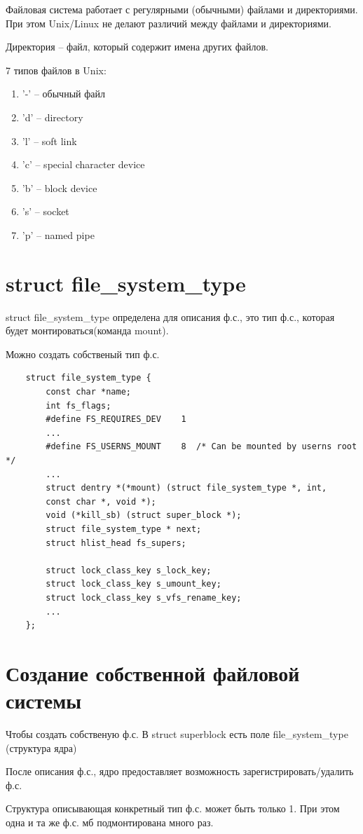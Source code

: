 Файловая система работает с регулярными (обычными) файлами и директориями. При этом Unix/Linux не делают различий между файлами и директориями.

Директория -- файл, который содержит имена других файлов.

7 типов файлов в Unix:
\begin{enumerate}
    \item '-' -- обычный файл
    \item 'd' -- directory
    \item 'l' -- soft link
    \item 'c' -- special character device
    \item 'b' -- block device
    \item 's' -- socket
    \item 'p' -- named pipe
\end{enumerate}

\section{struct file\_system\_type}

struct file\_system\_type определена для описания ф.с., это тип ф.с., которая будет монтироваться(команда mount). 

Можно создать собственый тип ф.с.
\begin{lstlisting}
	struct file_system_type {
		const char *name;
		int fs_flags;
		#define FS_REQUIRES_DEV    1 
		...
		#define FS_USERNS_MOUNT    8  /* Can be mounted by userns root */
		...
		struct dentry *(*mount) (struct file_system_type *, int,
		const char *, void *);
		void (*kill_sb) (struct super_block *);
		struct file_system_type * next;
		struct hlist_head fs_supers;
		
		struct lock_class_key s_lock_key;
		struct lock_class_key s_umount_key;
		struct lock_class_key s_vfs_rename_key;
		...
	};
\end{lstlisting}


\section{Создание собственной файловой системы}

Чтобы создать собственую ф.с. В struct superblock есть поле file\_system\_type (структура ядра)

После описания ф.с., ядро предоставляет возможность зарегистрировать/удалить ф.с.

Структура описывающая конкретный тип ф.с. может быть только 1. При этом одна и та же ф.с. мб подмонтирована много раз.

